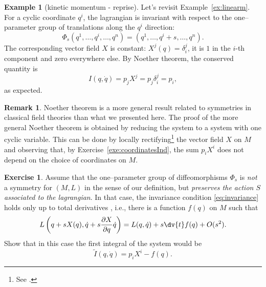 \documentclass[english,fontsize=11pt,paper=b5]{scrbook}
\numberwithin{equation}{chapter}
\theoremstyle{definition}
\newtheorem{remark}{Remark}[chapter]
\newtheorem{example}{Example}[chapter]
\newtheorem{exercise}{Exercise}[chapter]
\begin{document}
    \begin{example}[kinetic momentum - reprise]\label{exa:kmom}
      Let's revisit Example~\ref{ex:linearm}.
      For a cyclic coordinate $q^i$, the lagrangian is invariant with respect to the one--parameter group of translations along the $q^i$ direction:
      \begin{equation}
        \Phi_s(q^1, \ldots, q^i, \ldots, q^n) = (q^1, \ldots, q^i + s, \ldots, q^n).
      \end{equation}
      The corresponding vector field $X$ is constant: $X^j(q) = \delta^j_i$, it is $1$ in the $i$-th component and zero everywhere else.
      By Noether theorem, the conserved quantity is
      \begin{equation}
        I(q,\dot q) = p_j X^j = p_j \delta^j_i = p_i,
      \end{equation}
      as expected.
    \end{example}

    \begin{remark}
      Noether theorem is a more general result related to symmetries in classical field theories than what we presented here.
      The proof of the more general Noether theorem is obtained by reducing the system to a system with one cyclic variable.
      This can be done by locally rectifying\footnote{See \cite[Chapter 3.5]{lectures:aom:seri}.} the vector field $X$ on $M$ and
      observing that, by Exercise~\ref{exe:coordinatesInd}, the sum $p_i X^i$ does not depend on the choice of coordinates on $M$.
    \end{remark}

    \begin{exercise}
      Assume that the one--parameter group of diffeomorphisms $\Phi_s$ is \emph{not} a symmetry for $(M,L)$ in the sense of our definition, but \emph{preserves the action $S$ associated to the lagrangian}.
      In that case, the invariance condition \eqref{eq:invariance} holds only up to total derivatives \cite[Chapter 4.20]{book:gelfand}, i.e., there is a function $f(q)$ on $M$ such that
      \begin{equation}
        L\left( q + s X(q), \dot q + s \frac{\partial X}{\partial q} \dot q\right)
        = L(q, \dot q) + s \dv{t}f(q) + O(s^2).
      \end{equation}
      Show that in this case the first integral of the system would be
      \begin{equation}
        \widetilde I(q, \dot q) = p_i X^i - f(q).
      \end{equation}
    \end{exercise}
\end{document}
